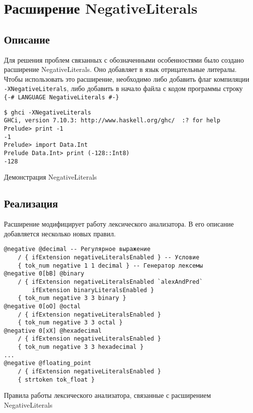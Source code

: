 \section{Расширение NegativeLiterals}

\subsection{Описание}

Для решения проблем связанных с обозначенными особенностями было создано
расширение NegativeLiterals. Оно добавляет в язык отрицательные литералы.
Чтобы использовать это расширение, необходимо либо добавить флаг компиляции
\texttt{-XNegativeLiterals}, либо добавить в начало файла с кодом программы
строку\\
\texttt{\{-\#\ LANGUAGE\ NegativeLiterals\ \#-\}}

\begin{ListingEnv}[H]
\begin{lstlisting}
$ ghci -XNegativeLiterals
GHCi, version 7.10.3: http://www.haskell.org/ghc/  :? for help
Prelude> print -1
-1
Prelude> import Data.Int
Prelude Data.Int> print (-128::Int8)
-128
\end{lstlisting}
\caption{Демонстрация NegativeLiterals}
\end{ListingEnv}

\subsection{Реализация}

Расширение модифицирует работу лексического анализатора. В его описание
добавляется несколько новых правил.

\begin{ListingEnv}[H]
\begin{verbatim}
@negative @decimal -- Регулярное выражение
    / { ifExtension negativeLiteralsEnabled } -- Условие
    { tok_num negative 1 1 decimal } -- Генератор лексемы
@negative 0[bB] @binary
    / { ifExtension negativeLiteralsEnabled `alexAndPred`
        ifExtension binaryLiteralsEnabled }
    { tok_num negative 3 3 binary }
@negative 0[oO] @octal
    / { ifExtension negativeLiteralsEnabled }
    { tok_num negative 3 3 octal }
@negative 0[xX] @hexadecimal
    / { ifExtension negativeLiteralsEnabled }
    { tok_num negative 3 3 hexadecimal }
...
@negative @floating_point
    / { ifExtension negativeLiteralsEnabled }
    { strtoken tok_float }
\end{verbatim}
\caption{Правила работы лексического анализатора, связанные с расширением
NegativeLiterals}
\label{lst:rules}
\end{ListingEnv}

